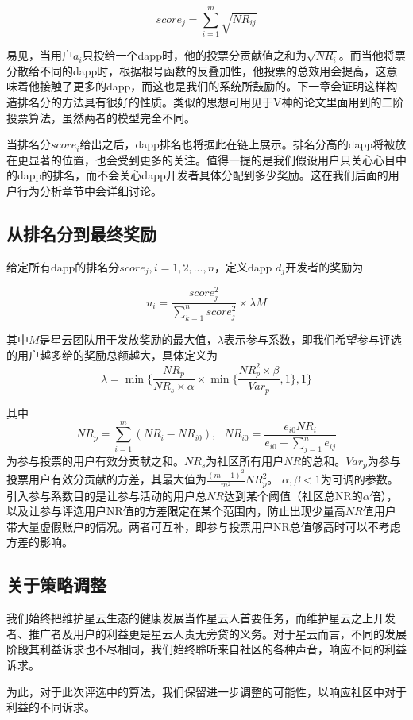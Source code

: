 $$score_j = \sum_{i=1}^m \sqrt{NR_{ij}}$$

易见，当用户$a_i$只投给一个dapp时，他的投票分贡献值之和为$\sqrt{NR_i}$。而当他将票分散给不同的dapp时，根据根号函数的反叠加性，他投票的总效用会提高，这意味着他接触了更多的dapp，而这也是我们的系统所鼓励的。下一章会证明这样构造排名分的方法具有很好的性质。类似的思想可用见于V神的论文\cite{buterin2018liberal}里面用到的二阶投票算法，虽然两者的模型完全不同。

当排名分$score_i$给出之后，dapp排名也将据此在链上展示。排名分高的dapp将被放在更显著的位置，也会受到更多的关注。值得一提的是我们假设用户只关心心目中的dapp的排名，而不会关心dapp开发者具体分配到多少奖励。这在我们后面的用户行为分析章节中会详细讨论。

\subsection{从排名分到最终奖励}
给定所有dapp的排名分$score_j,i=1,2,...,n$，定义dapp $d_j$开发者的奖励为

$$u_i = \frac{score_j^2}{\sum_{k=1}^n score_j^2}\times \lambda M$$

其中$M$是星云团队用于发放奖励的最大值，$\lambda $表示参与系数，即我们希望参与评选的用户越多给的奖励总额越大，具体定义为
$$\lambda=\min\{\frac{NR_p}{NR_s\times \alpha}\times \min\{\frac{NR_p^2\times \beta}{Var_p},1\},1\}$$

其中$$NR_p = \sum_{i=1}^m (NR_i-NR_{i0}),~~~NR_{i0} = \frac{e_{i0}NR_i}{e_{i0}+\sum_{j=1}^n {e_{ij}}}$$
为参与投票的用户有效分贡献之和。$NR_s$为社区所有用户$NR$的总和。$Var_p$为参与投票用户有效分贡献的方差，其最大值为$\frac{(m-1)^2}{m^2}NR_p^2$。
$\alpha,\beta<1$为可调的参数。引入参与系数目的是让参与活动的用户总$NR$达到某个阈值（社区总NR的$\alpha$倍），以及让参与评选用户NR值的方差限定在某个范围内，防止出现少量高$NR$值用户带大量虚假账户的情况。两者可互补，即参与投票用户NR总值够高时可以不考虑方差的影响。
\subsection{关于策略调整}
我们始终把维护星云生态的健康发展当作星云人首要任务，而维护星云之上开发者、推广者及用户的利益更是星云人责无旁贷的义务。对于星云而言，不同的发展阶段其利益诉求也不尽相同，我们始终聆听来自社区的各种声音，响应不同的利益诉求。

为此，对于此次评选中的算法，我们保留进一步调整的可能性，以响应社区中对于利益的不同诉求。
